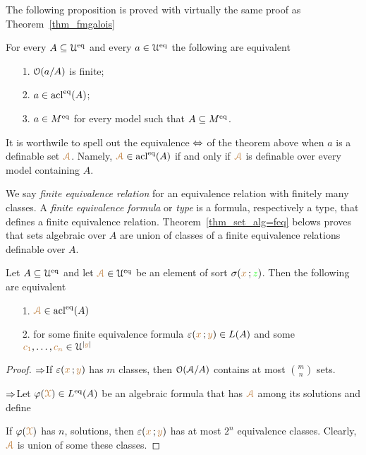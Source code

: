 \documentclass[creche.tex]{subfiles}
\begin{document}
The following proposition is proved with virtually the same proof as Theorem~\ref{thm_fmgalois}

\begin{theorem}\label{thm_Galois_alg=alg}
For every $A\subseteq\EuScript U^{{\rm eq}}$ and every $a\in\EuScript U^{{\rm eq}}$ the following are equivalent
\begin{itemize}
\item[1.] $\EuScript O(a/A)$ is finite;
\item[2.] $a\in\mathop{\rm acl}^{{\rm eq}}(A)$;
\item[3.] $a\in M^{{\rm eq}}$ for every model such that $A\subseteq M^{{\rm eq}}$.\QED
\end{itemize}
\end{theorem}

It is worthwile to spell out the equivalence $\Leftrightarrow$ of the theorem above when $a$ is a definable set ${\color{brown}\EuScript A}$.
Namely, ${\color{brown}\EuScript A}\in\mathop{\rm acl}^{{\rm eq}}(A)$ if and only if ${\color{brown}\EuScript A}$ is definable over every model containing $A$.

We say \emph{finite equivalence relation\/} for an equivalence relation with finitely many classes.
A \emph{finite equivalence formula\/} or \emph{type\/} is a formula, respectively a type, that defines a finite equivalence relation.
Theorem~\ref{thm_set_alg=feq} belows proves that sets algebraic over $A$ are union of classes of a finite equivalence relations definable over $A$.


\begin{theorem}\label{thm_set_alg=feq}
Let $A\subseteq\EuScript U^{{\rm eq}}$ and let ${\color{brown}\EuScript A}\in\EuScript U^{{\rm eq}}$ be an element of sort $\sigma({\color{brown} x}\,;{\color{green} z})$.
Then the following are equivalent
\begin{itemize}
\item[1.] ${\color{brown}\EuScript A}\in\mathop{\rm acl}^{{\rm eq}}(A)$
\item[2.] for some finite equivalence formula $\varepsilon({\color{brown} x}\,;{\color{brown} y})\in L(A)$ and some ${\color{brown} c_1},\dots,{\color{brown} c_n}\in\EuScript U^{|{\color{brown} y}|}$
\end{itemize}


\end{theorem}
\begin{proof} $\Rightarrow$\quad If  $\varepsilon({\color{brown} x}\,;{\color{brown} y})$ has $m$ classes, then $\EuScript O(\EuScript A/A)$ contains at most $\displaystyle\binom{m}{n}$ sets.

$\Rightarrow$\quad Let $\varphi({\color{brown}\EuScript X})\in L^{{\rm eq}}(A)$ be an algebraic formula that has ${\color{brown}\EuScript A}$ among its solutions and define


If $\varphi({\color{brown}\EuScript X})$ has $n$, solutions, then $\varepsilon({\color{brown} x}\,;{\color{brown} y})$ has at most $2^n$ equivalence classes.
Clearly, ${\color{brown}\EuScript A}$ is union of some these classes.
\end{proof}
\end{document}
